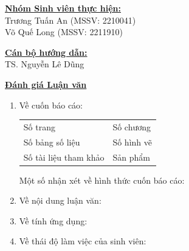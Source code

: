 \documentclass[12pt,a4paper]{article}
\begin{document}
\vspace{0.3cm}

\noindent
\begin{minipage}[t]{0.55\textwidth}
    \underline{\textbf{Nhóm Sinh viên thực hiện:}} \\[0.1cm]
    {\small Trương Tuấn An (MSSV: 2210041)}\\
    {\small Võ Quế Long (MSSV: 2211910)}
\end{minipage}
\hfill
\begin{minipage}[t]{0.4\textwidth}
    \underline{\textbf{Cán bộ hướng dẫn:}} \\[0.1cm]
    {\small TS. Nguyễn Lê Dũng}
\end{minipage}

\vspace{0.4cm}

\noindent \underline{\textbf{Đánh giá Luận văn}}
\begin{enumerate}[label=\arabic*., leftmargin=0.6cm]
    \item \small Về cuốn báo cáo: \\
    \vspace{-0.2cm}
    \begin{tabular}{p{} p{}}
        Số trang \dotfill & Số chương \dotfill \\
        Số bảng số liệu \dotfill & Số hình vẽ \dotfill \\
        Số tài liệu tham khảo \dotfill & Sản phẩm \dotfill
    \end{tabular}
    
    \vspace{0.2cm}
    Một số nhận xét về hình thức cuốn báo cáo: \dotfill \\
    \dotfill
    
    \vspace{0.2cm}
    \item Về nội dung luận văn: \dotfill \\
    \dotfill
    
    \vspace{0.2cm}
    \item Về tính ứng dụng: \dotfill \\
    \dotfill
    
    \vspace{0.2cm}
    \item Về thái độ làm việc của sinh viên: \dotfill \\
    \dotfill
\end{enumerate}
\end{document}
